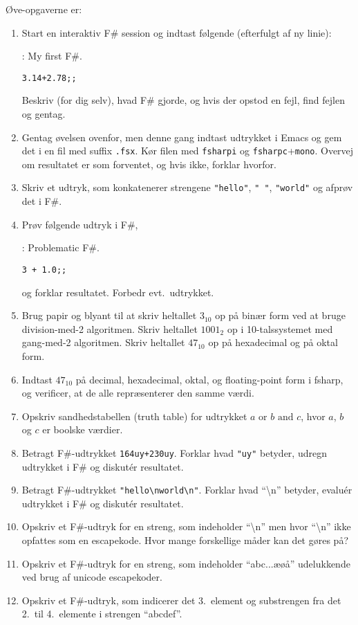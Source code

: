 \documentclass[a4paper,12pt]{article}
\begin{document}
Øve-opgaverne er:
\begin{enumerate}[label=2ø.\arabic*,start=0]
\item Start en interaktiv F\# session og indtast følgende (efterfulgt af ny linie):
  \begin{codeNOutput}{: My first F\#.}
\begin{lstlisting}
3.14+2.78;;
\end{lstlisting}
  \end{codeNOutput}
  Beskriv (for dig selv), hvad F\# gjorde, og hvis der opstod en fejl, find fejlen og gentag.
\item Gentag øvelsen ovenfor, men denne gang indtast udtrykket i Emacs og gem det i en fil med suffix \verb|.fsx|. Kør filen med \lstinline[language=console]{fsharpi} og \lstinline[language=console]{fsharpc}+\lstinline[language=console]{mono}. Overvej om resultatet er som forventet, og hvis ikke, forklar hvorfor.
\item Skriv et udtryk, som konkatenerer strengene \lstinline{"hello"}, \lstinline{" "}, \lstinline{"world"} og afprøv det i F\#.
\item Prøv følgende udtryk i F\#,
  \begin{codeNOutput}{: Problematic F\#.}
\begin{lstlisting}
3 + 1.0;;
\end{lstlisting}
\end{codeNOutput}
og forklar resultatet. Forbedr evt.\ udtrykket.
\item Brug papir og blyant til at skriv heltallet $3_{10}$ op på binær form ved at bruge division-med-2 algoritmen. Skriv heltallet $1001_2$ op i 10-talssystemet med gang-med-2 algoritmen. Skriv heltallet $47_{10}$ op på hexadecimal og på oktal form.
\item Indtast $47_{10}$ på decimal, hexadecimal, oktal, og floating-point form i fsharp, og verificer, at de alle repræsenterer den samme værdi.
\item Opskriv sandhedstabellen (truth table) for udtrykket $a \text{ or } b \text{ and } c$, hvor $a$, $b$ og $c$ er boolske værdier.
\item Betragt F\#-udtrykket \lstinline{164uy+230uy}. Forklar hvad \lstinline{"uy"} betyder, udregn udtrykket i F\# og diskut\'{e}r resultatet.
\item Betragt F\#-udtrykket \lstinline{"hello\nworld\n"}. Forklar hvad ``\textbackslash n'' betyder, evalu\'{e}r udtrykket i F\# og diskut\'{e}r resultatet.
\item Opskriv et F\#-udtryk for en streng, som indeholder ``\textbackslash n'' men hvor ``\textbackslash n'' ikke opfattes som en escapekode. Hvor mange forskellige måder kan det gøres på?
\item Opskriv et F\#-udtryk for en streng, som indeholder ``abc...æøå'' udelukkende ved brug af unicode escapekoder.
\item Opskriv et F\#-udtryk, som indicerer det 3.\ element og substrengen fra det 2.\ til 4.\ elemente i strengen ``abcdef''.
\end{enumerate}
\end{document}
